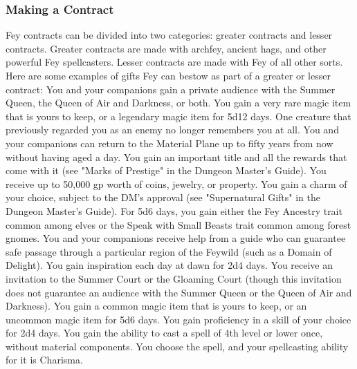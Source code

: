\documentclass[10pt,a4paper,twoside,twocolumn,openany,nodeprecatedcode,bg=print]{dndbook}
\begin{document}
\subsubsection{Making a Contract}
Fey contracts can be divided into two categories: greater contracts and lesser contracts. Greater contracts are made with archfey, ancient hags, and other powerful Fey spellcasters. Lesser contracts are made with Fey of all other sorts. Here are some examples of gifts Fey can bestow as part of a greater or lesser contract:
{{You and your companions gain a private audience with the Summer Queen, the Queen of Air and Darkness, or both.}}
{{You gain a very rare magic item that is yours to keep, or a legendary magic item for 5d12 days.}}
{{One creature that previously regarded you as an enemy no longer remembers you at all.}}
{{You and your companions can return to the Material Plane up to fifty years from now without having aged a day.}}
{{You gain an important title and all the rewards that come with it (see "Marks of Prestige" in the Dungeon Master's Guide).}}
{{You receive up to 50,000 gp worth of coins, jewelry, or property.}}
{{You gain a charm of your choice, subject to the DM's approval (see "Supernatural Gifts" in the Dungeon Master's Guide).}}
{{For 5d6 days, you gain either the Fey Ancestry trait common among elves or the Speak with Small Beasts trait common among forest gnomes.}}
{{You and your companions receive help from a guide who can guarantee safe passage through a particular region of the Feywild (such as a Domain of Delight).}}
{{You gain inspiration each day at dawn for 2d4 days.}}
{{You receive an invitation to the Summer Court or the Gloaming Court (though this invitation does not guarantee an audience with the Summer Queen or the Queen of Air and Darkness).}}
{{You gain a common magic item that is yours to keep, or an uncommon magic item for 5d6 days.}}
{{You gain proficiency in a skill of your choice for 2d4 days.}}
{{You gain the ability to cast a spell of 4th level or lower once, without material components. You choose the spell, and your spellcasting ability for it is Charisma.}}
\end{document}
